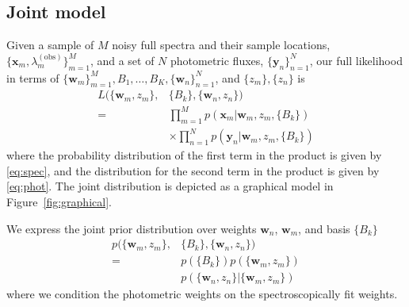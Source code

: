 \documentclass{article}
\begin{document}
\subsection{Joint model}
Given a sample of $M$ noisy full spectra and their sample locations, $\{\mathbf{x}_m, \lambda^{(\text{obs})}_m \}_{m=1}^M$, and a set of $N$ photometric fluxes, $\{\mathbf{y}_n\}_{n=1}^N$, our full likelihood in terms of $\{ \mathbf{w}_m \}_{m=1}^M, B_1, \dots, B_K, \{ \mathbf{w}_n \}_{n=1}^N$, and $\{z_m\}, \{z_n\}$ is 
\begin{align*}
  L( \{ \mathbf{w}_m, z_m \}, &\{ B_k \}, \{ \mathbf{w}_n, z_n \} )  \\
    = & \prod_{m=1}^M p( \mathbf{x}_m | \mathbf{w}_m, z_m, \{ B_k \})  \\
      & \times \prod_{n=1}^N p( \mathbf{y}_n | \mathbf{w}_m, z_m, \{ B_k \})
\end{align*}
where the probability distribution of the first term in the product is given by \ref{eq:spec}, and the distribution for the second term in the product is given by \ref{eq:phot}.  The joint distribution is depicted as a graphical model in Figure~\ref{fig:graphical}.

We express the joint prior distribution over weights $\mathbf{w}_n$, $\mathbf{w}_m$, and basis $\{B_k\}$
\begin{align}
  p( \{ \mathbf{w}_m, z_m \}, &\{ B_k \}, \{ \mathbf{w}_n, z_n \} )  \\
    = & p(\{ B_k \}) p( \{ \mathbf{w}_m, z_m \} )  \\
      & p( \{ \mathbf{w}_n, z_n \} | \{ \mathbf{w}_m, z_m \} ) 
\end{align}
where we condition the photometric weights on the spectroscopically fit weights.  

\end{document}
